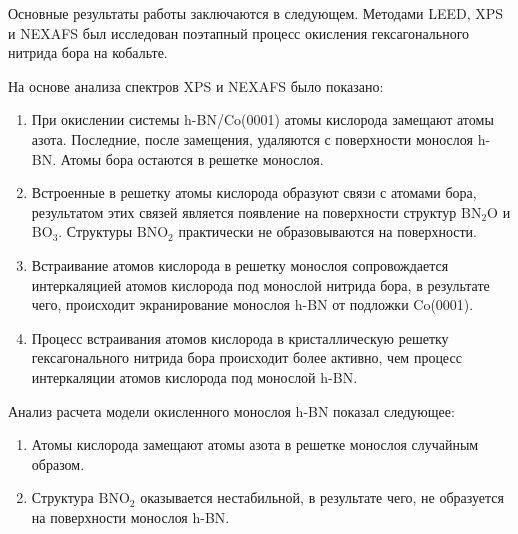 Основные результаты работы заключаются в следующем. Методами LEED, XPS и NEXAFS был исследован поэтапный процесс
окисления гексагонального нитрида бора на кобальте. 


На основе анализа спектров XPS и NEXAFS было показано:
\begin{enumerate}
  \item При окислении системы h-BN/Co(0001) атомы кислорода замещают атомы азота. Последние, после замещения,
  удаляются с поверхности монослоя h-BN. Атомы бора остаются в решетке монослоя.
  \item Встроенные в решетку атомы кислорода образуют связи с атомами бора, результатом этих связей
  является появление на поверхности структур $\mathrm{BN_2O}$ и $\mathrm{BO_3}$. Структуры $\mathrm{BNO_2}$ 
  практически не образовываются на поверхности.
  \item Встраивание атомов кислорода в решетку монослоя сопровождается интеркаляцией атомов кислорода
  под монослой нитрида бора, в результате чего, происходит экранирование монослоя h-BN от подложки Co(0001).
  \item  Процесс встраивания атомов кислорода в кристаллическую решетку гексагонального нитрида бора происходит
  более активно, чем процесс интеркаляции атомов кислорода под монослой h-BN.
\end{enumerate}
Анализ расчета модели окисленного монослоя h-BN показал следующее:
\begin{enumerate}
	\item Атомы кислорода замещают атомы азота в решетке монослоя случайным образом.
	\item Структура $\mathrm{BNO_2}$ оказывается нестабильной, в результате чего, не образуется
	на поверхности монослоя h-BN.
\end{enumerate}
